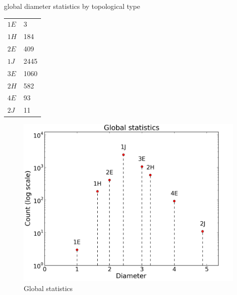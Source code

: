\documentclass[12pt]{article}
\begin{document}
global diameter statistics by topological type

\begin{tabular} {| l l |}
\hline
$1E$ &       3\\
$1H$ &       184\\
$2E$ &       409\\
$1J$ &       2445\\
$3E$ &       1060\\
$2H$ &       582\\
$4E$ &       93\\
$2J$ &       11\\
\hline
\end{tabular}


\begin{figure}
    \begin{center}
    \includegraphics[width=0.6\linewidth]{figures/global_statistics.png}
    \caption{Global statistics}
    \end{center}
    \label{global_statistics}
\end{figure}



\end{document}
